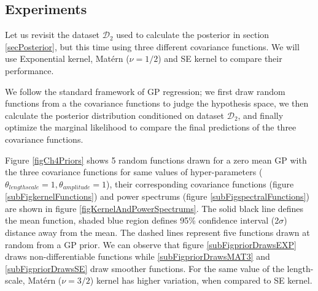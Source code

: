 \subsection{Experiments}\label{subsecCH4Experiments}
\begin{mdframed}[hidealllines=true,backgroundcolor=lightgray!20]
Let us revisit the dataset $\mathcal{D}_{2}$ used to calculate the posterior in section \ref{secPosterior}, but this time using three different covariance functions. We will use Exponential kernel, Mat\'ern ($\nu=1/2$) and SE kernel to compare their performance. 

We follow the standard framework of GP regression; we first draw random functions from a the covariance functions to judge the hypothesis space, we then calculate the posterior distribution conditioned on dataset $\mathcal{D}_{2}$, and finally optimize the marginal likelihood to compare the final predictions of the three covariance functions. 

Figure \ref{figCh4Priors} shows 5 random functions drawn for a zero mean GP with the three covariance functions for same values of hyper-parameters ($\theta_{lengthscale} = 1, \theta_{amplitude} = 1$), their corresponding covariance functions (figure \ref{subFigkernelFunctions}) and power spectrums (figure \ref{subFigspectralFunctions}) are shown in figure \ref{figKernelAndPowerSpectrums}. The solid black line defines the mean function, shaded blue region defines 95\% confidence interval (2$\sigma$) distance away from the mean. The dashed lines represent five functions drawn at random from a GP prior. We can observe that figure \ref{subFigpriorDrawsEXP} draws non-differentiable functions while \ref{subFigpriorDrawsMAT3} and \ref{subFigpriorDrawsSE} draw smoother functions. For the same value of the length-scale, Mat\'ern ($\nu=3/2$) kernel has higher variation, when compared to SE kernel.
\end{mdframed}

